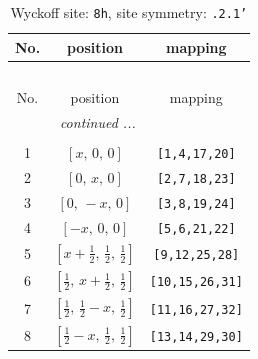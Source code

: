 \documentclass[fleqn,8pt]{jsarticle}
\begin{document}
\begin{longtable}{ccc}
\caption{Wyckoff site: {\tt 8h}, site symmetry: {\tt .2.1'}}
 \\
 \hline \hline
No. & position & mapping \\ \hline \endfirsthead

\multicolumn{2}{l}{\tablename\ \thetable{}} \\
 \hline \hline
No. & position & mapping \\ \hline \endhead

 \hline \hline
\multicolumn{2}{r}{\footnotesize\it continued ...} \\ \endfoot

 \hline \hline
\multicolumn{2}{r}{} \\ \endlastfoot

1 & $\left[ x,\, 0,\, 0 \right]$ & {\tt [1,4,17,20]} \\ \hline
2 & $\left[ 0,\, x,\, 0 \right]$ & {\tt [2,7,18,23]} \\ \hline
3 & $\left[ 0,\, - x,\, 0 \right]$ & {\tt [3,8,19,24]} \\ \hline
4 & $\left[ - x,\, 0,\, 0 \right]$ & {\tt [5,6,21,22]} \\ \hline
5 & $\left[ x + \frac{1}{2},\, \frac{1}{2},\, \frac{1}{2} \right]$ & {\tt [9,12,25,28]} \\ \hline
6 & $\left[ \frac{1}{2},\, x + \frac{1}{2},\, \frac{1}{2} \right]$ & {\tt [10,15,26,31]} \\ \hline
7 & $\left[ \frac{1}{2},\, \frac{1}{2} - x,\, \frac{1}{2} \right]$ & {\tt [11,16,27,32]} \\ \hline
8 & $\left[ \frac{1}{2} - x,\, \frac{1}{2},\, \frac{1}{2} \right]$ & {\tt [13,14,29,30]} \\
\end{longtable}
\renewcommand{\arraystretch}{1.2}
\end{document}
